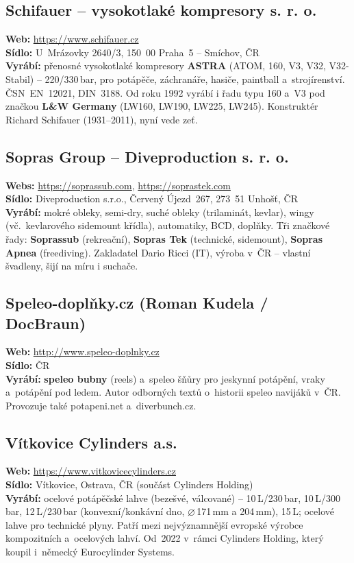 \documentclass[11pt,a4paper]{article}
\begin{document}
\subsection{Schifauer -- vysokotlaké kompresory s. r. o.}
\textbf{Web:} \url{https://www.schifauer.cz} \\
\textbf{Sídlo:} U~Mrázovky 2640/3, 150~00 Praha~5 -- Smíchov, ČR \\
\textbf{Vyrábí:} přenosné vysokotlaké kompresory \textbf{ASTRA} (ATOM, 160, V3, V32, V32-Stabil) -- 220/330\,bar, pro potápěče, záchranáře, hasiče, paintball a~strojírenství. ČSN~EN~12021, DIN~3188. Od roku 1992 vyrábí i řadu typu 160 a~V3 pod značkou \textbf{L\&W Germany} (LW160, LW190, LW225, LW245). Konstruktér Richard Schifauer (1931--2011), nyní vede zeť.

\subsection{Sopras Group -- Diveproduction s. r. o.}
\textbf{Webs:} \url{https://soprassub.com}, \url{https://soprastek.com} \\
\textbf{Sídlo:} Diveproduction s.r.o., Červený Újezd~267, 273~51 Unhošť, ČR \\
\textbf{Vyrábí:} mokré obleky, semi-dry, suché obleky (trilaminát, kevlar), wingy (vč.~kevlarového sidemount křídla), automatiky, BCD, doplňky. Tři značkové řady: \textbf{Soprassub} (rekreační), \textbf{Sopras Tek} (technické, sidemount), \textbf{Sopras Apnea} (freediving). Zakladatel Dario Ricci (IT), výroba v~ČR -- vlastní švadleny, šijí na míru i suchače.

\subsection{Speleo-doplňky.cz (Roman Kudela / DocBraun)}
\textbf{Web:} \url{http://www.speleo-doplnky.cz} \\
\textbf{Sídlo:} ČR \\
\textbf{Vyrábí:} \textbf{speleo bubny} (reels) a~speleo šňůry pro jeskynní potápění, vraky a~potápění pod ledem. Autor odborných textů o~historii speleo navijáků v~ČR. Provozuje také potapeni.net a~diverbunch.cz.

\subsection{Vítkovice Cylinders a.s.}
\textbf{Web:} \url{https://www.vitkovicecylinders.cz} \\
\textbf{Sídlo:} Vítkovice, Ostrava, ČR (součást Cylinders Holding) \\
\textbf{Vyrábí:} ocelové potápěčské lahve (bezešvé, válcované) -- 10\,L/230\,bar, 10\,L/300\,bar, 12\,L/230\,bar (konvexní/konkávní dno, $\varnothing$\,171\,mm a 204\,mm), 15\,L; ocelové lahve pro technické plyny. Patří mezi nejvýznamnější evropské výrobce kompozitních a~ocelových lahví. Od~2022 v~rámci Cylinders Holding, který koupil i~německý Eurocylinder Systems.
\end{document}
